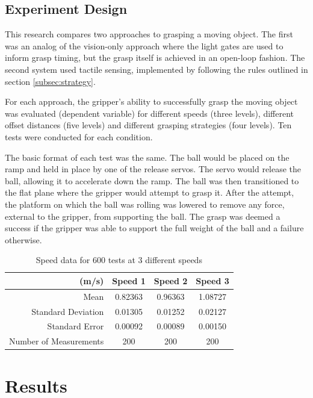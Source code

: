 \subsection{Experiment Design} %
This research compares two approaches to grasping a moving object. The first was an analog of the vision-only approach where the light gates are used to inform grasp timing, but the grasp itself is achieved in an open-loop fashion. The second system used tactile sensing, implemented by following the rules outlined in section \ref{subsec:strategy}.

For each approach, the gripper's ability to successfully grasp the moving object was evaluated (dependent variable) for  different speeds (three levels), different offset distances (five levels) and different grasping strategies (four levels). Ten tests were conducted for each condition. 

The basic format of each test was the same. The ball would be placed on the ramp and held in place by one of the release servos. The servo would release the ball, allowing it to accelerate down the ramp. The ball was then transitioned to the flat plane where the gripper would attempt to grasp it. After the attempt, the platform on which the ball was rolling was lowered to remove any force, external to the gripper, from supporting the ball. The grasp was deemed a success if the gripper was able to support the full weight of the ball and a failure otherwise. 

\begin{table}[ht]
\centering
\begin{tabular}{r|c|c|c}
\textbf{(m/s)}           & \textbf{Speed 1}       & \textbf{Speed 2}       & \textbf{Speed 3}       \\
\hline
Mean                   & 0.82363 & 0.96363 & 1.08727   \\
Standard Deviation     & 0.01305 & 0.01252 & 0.02127   \\
Standard Error         & 0.00092 & 0.00089 & 0.00150   \\
Number of Measurements & 200     & 200     & 200 
\end{tabular}
\caption{Speed data for 600 tests at 3 different speeds}
\label{tab:repeatability}
\end{table}

\section{Results}


